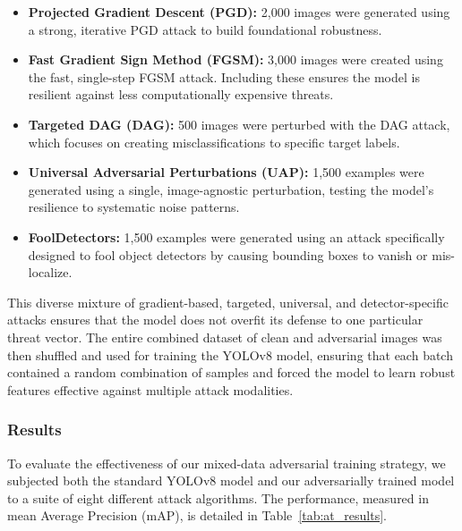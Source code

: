 \documentclass[../main.tex]{subfiles}
\begin{document}
\begin{itemize}
    \item \textbf{Projected Gradient Descent (PGD):} 2,000 images were generated using a strong, iterative PGD attack to build foundational robustness.
    
    \item \textbf{Fast Gradient Sign Method (FGSM):} 3,000 images were created using the fast, single-step FGSM attack. Including these ensures the model is resilient against less computationally expensive threats.
    
    \item \textbf{Targeted DAG (DAG):} 500 images were perturbed with the DAG attack, which focuses on creating misclassifications to specific target labels.
    
    \item \textbf{Universal Adversarial Perturbations (UAP):} 1,500 examples were generated using a single, image-agnostic perturbation, testing the model's resilience to systematic noise patterns.
    
    \item \textbf{FoolDetectors:} 1,500 examples were generated using an attack specifically designed to fool object detectors by causing bounding boxes to vanish or mis-localize.
\end{itemize}

This diverse mixture of gradient-based, targeted, universal, and detector-specific attacks ensures that the model does not overfit its defense to one particular threat vector. The entire combined dataset of clean and adversarial images was then shuffled and used for training the YOLOv8 model, ensuring that each batch contained a random combination of samples and forced the model to learn robust features effective against multiple attack modalities.

\subsubsection{Results}
\label{sec:adversarial_training_results}
To evaluate the effectiveness of our mixed-data adversarial training strategy, we subjected both the standard YOLOv8 model and our adversarially trained model to a suite of eight different attack algorithms. The performance, measured in mean Average Precision (mAP), is detailed in Table~\ref{tab:at_results}.
\end{document}
